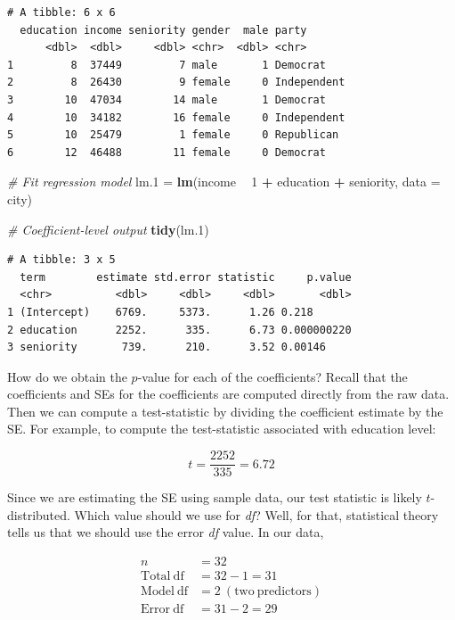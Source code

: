 \documentclass[]{book}
\newenvironment{Shaded}{\begin{snugshade}}{\end{snugshade}}
\newcommand{\CommentTok}[1]{\textcolor[rgb]{0.56,0.35,0.01}{\textit{#1}}}
\newcommand{\DataTypeTok}[1]{\textcolor[rgb]{0.13,0.29,0.53}{#1}}
\newcommand{\DecValTok}[1]{\textcolor[rgb]{0.00,0.00,0.81}{#1}}
\newcommand{\FloatTok}[1]{\textcolor[rgb]{0.00,0.00,0.81}{#1}}
\newcommand{\KeywordTok}[1]{\textcolor[rgb]{0.13,0.29,0.53}{\textbf{#1}}}
\newcommand{\NormalTok}[1]{#1}
\newcommand{\OperatorTok}[1]{\textcolor[rgb]{0.81,0.36,0.00}{\textbf{#1}}}
\newcommand{\StringTok}[1]{\textcolor[rgb]{0.31,0.60,0.02}{#1}}
\begin{document}
\begin{verbatim}
# A tibble: 6 x 6
  education income seniority gender  male party      
      <dbl>  <dbl>     <dbl> <chr>  <dbl> <chr>      
1         8  37449         7 male       1 Democrat   
2         8  26430         9 female     0 Independent
3        10  47034        14 male       1 Democrat   
4        10  34182        16 female     0 Independent
5        10  25479         1 female     0 Republican 
6        12  46488        11 female     0 Democrat   
\end{verbatim}

\begin{Shaded}
\begin{Highlighting}[]
\CommentTok{# Fit regression model}
\NormalTok{lm}\FloatTok{.1}\NormalTok{ =}\StringTok{ }\KeywordTok{lm}\NormalTok{(income }\OperatorTok{~}\StringTok{ }\DecValTok{1} \OperatorTok{+}\StringTok{ }\NormalTok{education }\OperatorTok{+}\StringTok{ }\NormalTok{seniority, }\DataTypeTok{data =}\NormalTok{ city)}

\CommentTok{# Coefficient-level output}
\KeywordTok{tidy}\NormalTok{(lm}\FloatTok{.1}\NormalTok{)}
\end{Highlighting}
\end{Shaded}

\begin{verbatim}
# A tibble: 3 x 5
  term        estimate std.error statistic     p.value
  <chr>          <dbl>     <dbl>     <dbl>       <dbl>
1 (Intercept)    6769.     5373.      1.26 0.218      
2 education      2252.      335.      6.73 0.000000220
3 seniority       739.      210.      3.52 0.00146    
\end{verbatim}

How do we obtain the \(p\)-value for each of the coefficients? Recall that the coefficients and SEs for the coefficients are computed directly from the raw data. Then we can compute a test-statistic by dividing the coefficient estimate by the SE. For example, to compute the test-statistic associated with education level:

\[
t = \frac{2252}{335} = 6.72
\]

Since we are estimating the SE using sample data, our test statistic is likely \(t\)-distributed. Which value should we use for \emph{df}? Well, for that, statistical theory tells us that we should use the error \emph{df} value. In our data,

\[
\begin{split}
n &= 32 \\
\mathrm{Total~df} &= 32-1 = 31\\
\mathrm{Model~df} &= 2~\mathrm{(two~predictors)} \\
\mathrm{Error~df} &= 31-2 = 29
\end{split}
\]
\end{document}
